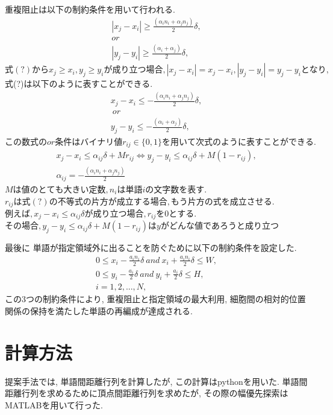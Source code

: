\documentclass[syuuron]{kuee}
\begin{document}
				重複阻止は以下の制約条件を用いて行われる. 				
				\begin{eqnarray}
					|x_j - x_i| \ge \frac{( \alpha_i n_i + \alpha_j n_j)} {2} \delta,\nonumber \\
					  or  \\
					|y_j - y_i| \ge \frac{( \alpha_i + \alpha_j)} {2} \delta,\nonumber 
				\end{eqnarray}
				$式(?)から x_j \ge x_i, y_j \ge y_i が成り立つ場合,|x_j - x_i|= x_j-x_i, |y_j - y_i| = y_j-y_iとなり, $
				式(?)は以下のように表すことができる.				
				\begin{eqnarray}
					x_j - x_i \le - \frac{( \alpha_i n_i + \alpha_j n_j)} {2} \delta,\nonumber \\
					 \: or \: \\
					y_j - y_i \le - \frac{( \alpha_i + \alpha_j)} {2} \delta,\nonumber 
				\end{eqnarray}
				$この数式の or 条件はバイナリ値r_{ij} \in \bigl\{0, 1 \bigl\}を用いて次式のように表すことができる. $
				\begin{eqnarray}
					x_j - x_i \le \alpha_{ij} \delta + M r_{ij} 
					\Leftrightarrow
					y_j - y_i \le \alpha_{ij} \delta + M(1 - r_{ij}) ,\\
					\alpha_{ij} = - \frac{(\alpha_i n_i + \alpha_j n_j)} {2}
				\end{eqnarray}
				$Mは値のとても大きい定数, n_iは単語iの文字数を表す.$
				$r_{ij}は式(?)の不等式の片方が成立する場合, もう片方の式を成立させる. $
				$例えば,  x_j - x_i \le \alpha_{ij} \delta が成り立つ場合, r_{ij}を0とする. $
				$その場合, y_j - y_i \le \alpha_{ij} \delta + M(1 - r_{ij})はyがどんな値であろうと成り立つ$
				
				最後に 単語が指定領域外に出ることを防ぐために以下の制約条件を設定した.
				\begin{eqnarray}
					0 \le x_i  -  \frac{a_i n_i} {2} \delta \:  and \:  x_i  +  \frac{a_i n_i} {2} \delta \le W, \nonumber \\
					0 \le y_i  -  \frac{a_i} {2} \delta  \: and \:  y_i  +  \frac{a_i} {2} \delta \le H ,\\
					i = 1, 2, ...,N, \nonumber
				\end{eqnarray}
				この3つの制約条件により, 重複阻止と指定領域の最大利用, 細胞間の相対的位置関係の保持を満たした単語の再編成が達成される. 
	
	\section{計算方法}
		提案手法では, 単語間距離行列を計算したが, この計算はpythonを用いた. 
		単語間距離行列を求めるために頂点間距離行列を求めたが, その際の幅優先探索はMATLABを用いて行った. 
				
\end{document}
